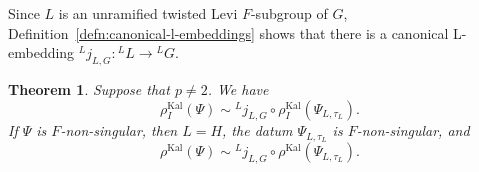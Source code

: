 \documentclass[reqno]{amsart}
\numberwithin{equation}{subsection}
\newcommand{\co}{\colon}
\newcommand{\ld}{{}^L}
\newcommand\cT{\mathcal{T}}
\DeclareMathOperator{\Kal}{Kal}
\newtheorem{thm}{Theorem}[subsection]
\theoremstyle{remark}
\newtheorem{remark}[thm]{Remark}
\numberwithin{equation}{subsection}
\numberwithin{figure}{subsection}
\begin{document}

Since $L$ is an unramified twisted Levi $F$-subgroup of $G$, Definition~\ref{defn:canonical-l-embeddings} shows that there is a canonical L-embedding $\ld j_{L,G}\co\ld L\to\ld G$.

\begin{thm}\label{thm:kaletha-functoriality}
Suppose that $p \neq 2$. We have
\begin{equation}\label{eqn:kaletha-inertial-functoriality}
\rho_I^{\Kal}(\Psi) \sim \ld j_{L,G} \circ \rho_I^{\Kal}(\Psi_{L,\tau_L}).
\end{equation}
If $\Psi$ is $F$-non-singular, then $L = H$, the datum $\Psi_{L,\tau_L}$ is $F$-non-singular, and
\begin{equation}\label{eqn:kaletha-non-singular-functoriality}
\rho^{\Kal}(\Psi) \sim \ld j_{L, G} \circ \rho^{\Kal}(\Psi_{L,\tau_L}).
\end{equation}
\end{thm}
\end{document}
